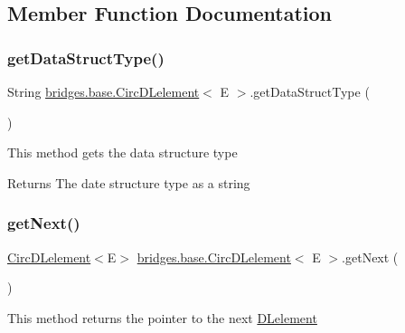 \subsection{Member Function Documentation}
\mbox{\label{classbridges_1_1base_1_1_circ_d_lelement_ab4885ae7517f1dd04874270c1c3eaf44}} 
\subsubsection{\texorpdfstring{get\+Data\+Struct\+Type()}{getDataStructType()}}
{\footnotesize\ttfamily String \mbox{\hyperlink{classbridges_1_1base_1_1_circ_d_lelement}{bridges.\+base.\+Circ\+D\+Lelement}}$<$ E $>$.get\+Data\+Struct\+Type (\begin{DoxyParamCaption}{ }\end{DoxyParamCaption})}

This method gets the data structure type

\begin{DoxyReturn}{Returns}
The date structure type as a string 
\end{DoxyReturn}
\mbox{\label{classbridges_1_1base_1_1_circ_d_lelement_a9ace56dde1f4c23e9a8798c045100ee6}} 
\subsubsection{\texorpdfstring{get\+Next()}{getNext()}}
{\footnotesize\ttfamily \mbox{\hyperlink{classbridges_1_1base_1_1_circ_d_lelement}{Circ\+D\+Lelement}}$<$E$>$ \mbox{\hyperlink{classbridges_1_1base_1_1_circ_d_lelement}{bridges.\+base.\+Circ\+D\+Lelement}}$<$ E $>$.get\+Next (\begin{DoxyParamCaption}{ }\end{DoxyParamCaption})}

This method returns the pointer to the next \mbox{\hyperlink{classbridges_1_1base_1_1_d_lelement}{D\+Lelement}}

